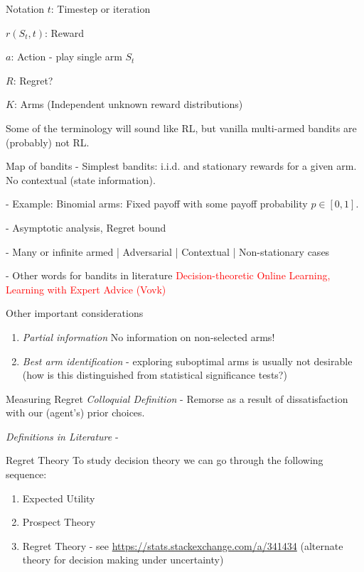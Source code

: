 \documentclass[usenames,dvipsnames]{beamer}
\theoremstyle{definition}
\begin{document}
\begin{frame}{Notation}
  $t$: Timestep or iteration

  $r(S_t, t)$: Reward

  $a$: Action - play single arm $S_t$

  $R$: Regret?

  $K$: Arms (Independent unknown reward distributions)

  Some of the terminology will sound like RL, but vanilla multi-armed bandits are (probably) not RL.
\end{frame}

\begin{frame}{Map of bandits}
  - Simplest bandits: i.i.d. and stationary rewards for a given arm. No contextual (state information).

  - Example: Binomial arms: Fixed payoff with some payoff probability $p \in [0, 1]$.

  - Asymptotic analysis, Regret bound

  - Many or infinite armed | Adversarial | Contextual | Non-stationary cases

  - Other words for bandits in literature \textcolor{red}{Decision-theoretic Online Learning, Learning with Expert Advice (Vovk)}
\end{frame}

\begin{frame}{Other important considerations}
  \begin{enumerate}
    \item \emph{Partial information} No information on non-selected arms!
    
    \item \emph{Best arm identification} - exploring suboptimal arms is usually not desirable (how is this distinguished from statistical significance tests?)
  \end{enumerate}
\end{frame}

\begin{frame}{Measuring Regret}
  \emph{Colloquial Definition} - Remorse as a result of dissatisfaction with our (agent's) prior choices.
  
  \emph{Definitions in Literature} - 

\end{frame}


\begin{frame}{Regret Theory}
To study decision theory we can go through the following sequence:

\begin{enumerate}
  \item Expected Utility 
  \item Prospect Theory
  \item Regret Theory - see \url{https://stats.stackexchange.com/a/341434} (alternate theory for decision making under uncertainty)
\end{enumerate}
\end{frame}
\end{document}
